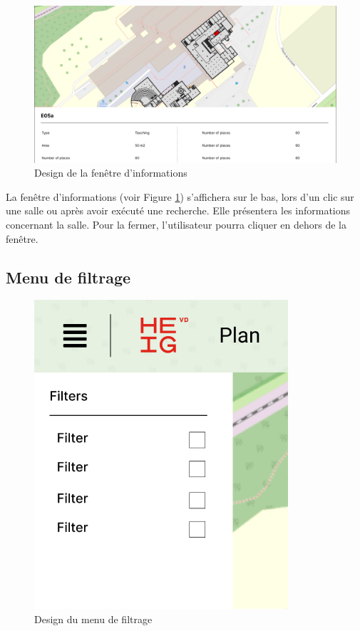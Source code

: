 \documentclass[
    iai, %
    il, %
]{heig-tb}
\begin{document}
\begin{figure}[h]
    \centering
    \includegraphics[scale=0.35]{designInfo.png}
    \caption{Design de la fenêtre d'informations}
    \label{fig:infoPanel}
\end{figure}

La fenêtre d'informations (voir Figure \ref{fig:infoPanel}) s'affichera sur le bas, lors d'un clic sur une salle ou après avoir exécuté une recherche.
Elle présentera les informations concernant la salle.
Pour la fermer, l'utilisateur pourra cliquer en dehors de la fenêtre.

\subsection{Menu de filtrage}

\begin{figure}[h]
    \centering
    \includegraphics[scale=0.5]{designFilter.png}
    \caption{Design du menu de filtrage}
    \label{fig:filterPanel}
\end{figure}
\end{document}
